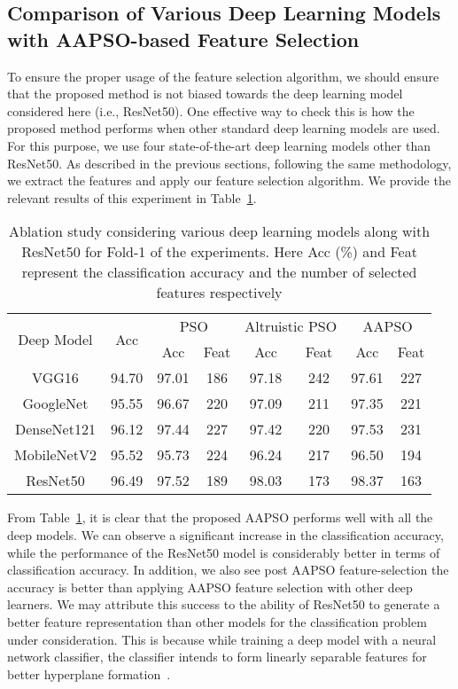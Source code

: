 \documentclass[final,3p,times]{elsarticle}
\begin{document}
\subsection{Comparison of Various Deep Learning Models with AAPSO-based Feature Selection}
{To {ensure} the proper {usage} of the feature selection algorithm, we should ensure that the proposed method is not biased towards the deep learning model considered here (i.e., ResNet50). One effective way to check this is how the proposed method performs when other standard deep learning models are used. For this purpose, we use four state-of-the-art deep learning models other than ResNet50. As described in the previous sections, following the same {methodology}, we extract the features and apply our feature selection algorithm.{ We provide the relevant} results of this experiment in Table~\ref{tab:deeppso}.}
\begin{table}[ht!]
    \centering
    \caption{Ablation study considering various deep learning models along with ResNet50 for Fold-1 of the experiments. Here Acc (\%) and Feat represent the classification accuracy and the number of selected features respectively}
    \begin{tabular}{c|c|cc|cc|cc}
    \toprule
    \multirow{2}{*}{Deep Model} &\multirow{2}{*}{Acc} & \multicolumn{2}{c|}{PSO} & \multicolumn{2}{c|}{Altruistic PSO} & \multicolumn{2}{c}{AAPSO}\\
    \cmidrule{3-8}
    & & Acc & Feat& Acc & Feat& Acc & Feat\\
    \midrule
    VGG16 & 94.70 & 97.01 & 186 & 97.18 & 242 & 97.61 & 227\\
    GoogleNet & 95.55 & 96.67 & 220 & 97.09 & 211 & 97.35 & 221\\
    DenseNet121 & 96.12 & 97.44 & 227 & 97.42 & 220 & 97.53 & 231\\
    MobileNetV2 & 95.52 & 95.73 & 224 & 96.24 & 217 & 96.50 & 194\\
    \midrule
    ResNet50 & 96.49 & 97.52 &189 & 98.03 & 173 & 98.37 & 163\\
    \bottomrule
    \end{tabular}
    \label{tab:deeppso}
\end{table}
{From Table~\ref{tab:deeppso}, it is clear that the proposed AAPSO performs well with all the deep models. We can observe a significant increase in the classification accuracy, while the performance of the ResNet50 model is considerably better in terms of classification {accuracy. In addition,} we also see post AAPSO feature-selection the accuracy is better than applying AAPSO feature selection {with other deep learners.}{ We may attribute this} success to the ability of ResNet50 to generate a better feature representation than other models for the classification problem under consideration. This is {because} while training a deep model with a neural network {classifier,} the classifier intends to form linearly separable features for better hyperplane formation~\cite{an2015can}.}
\end{document}
